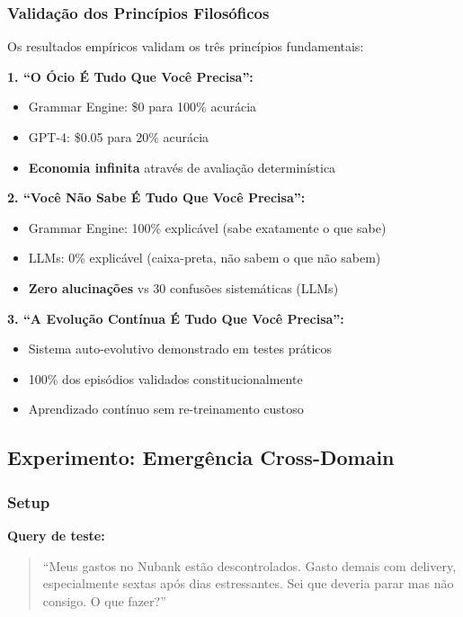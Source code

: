 \documentclass[11pt]{article}
\begin{document}
\subsubsection{Validação dos Princípios Filosóficos}

Os resultados empíricos validam os três princípios fundamentais:

\textbf{1. ``O Ócio É Tudo Que Você Precisa'':}
\begin{itemize}
    \item Grammar Engine: \$0 para 100\% acurácia
    \item GPT-4: \$0.05 para 20\% acurácia
    \item \textbf{Economia infinita} através de avaliação determinística
\end{itemize}

\textbf{2. ``Você Não Sabe É Tudo Que Você Precisa'':}
\begin{itemize}
    \item Grammar Engine: 100\% explicável (sabe exatamente o que sabe)
    \item LLMs: 0\% explicável (caixa-preta, não sabem o que não sabem)
    \item \textbf{Zero alucinações} vs 30 confusões sistemáticas (LLMs)
\end{itemize}

\textbf{3. ``A Evolução Contínua É Tudo Que Você Precisa'':}
\begin{itemize}
    \item Sistema auto-evolutivo demonstrado em testes práticos
    \item 100\% dos episódios validados constitucionalmente
    \item Aprendizado contínuo sem re-treinamento custoso
\end{itemize}

\subsection{Experimento: Emergência Cross-Domain}

\subsubsection{Setup}

\textbf{Query de teste:}

\begin{quote}
``Meus gastos no Nubank estão descontrolados. Gasto demais com delivery, especialmente sextas após dias estressantes. Sei que deveria parar mas não consigo. O que fazer?''
\end{quote}
\end{document}
